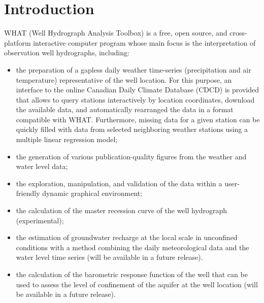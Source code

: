 \documentclass[12pt, letterpaper, fleqn]{report}
\begin{document}
\newpage


\listoffigures

\tableofcontents

\chapter{Introduction}

WHAT (Well Hydrograph Analysis Toolbox) is a free, open source, and cross-platform interactive computer program whose main focus is the interpretation of observation well hydrographs, including:

\begin{itemize}

\item{the preparation of a gapless daily weather time-series (precipitation and air temperature) representative of the well location. For this purpose, an interface to the online Canadian Daily Climate Database (CDCD) is provided that allows to query stations interactively by location coordinates, download the available data, and automatically rearranged the data in a format compatible with WHAT. Furthermore, missing data for a given station can be quickly filled with data from selected neighboring weather stations using a multiple linear regression model;}

\item{the generation of various publication-quality figures from the weather and water level data;}

\item{the exploration, manipulation, and validation of the data within a user-friendly dynamic graphical environment;}

\item{the calculation of the master recession curve of the well hydrograph (experimental);}

\item{the estimation of groundwater recharge at the local scale in unconfined conditions with a method combining the daily meteorological data and the water level time series (will be available in a future release).}

\item{the calculation of the barometric response function of the well that can be used to assess the level of confinement of the aquifer at the well location (will be available in a future release).}

\end{itemize}
\end{document}
